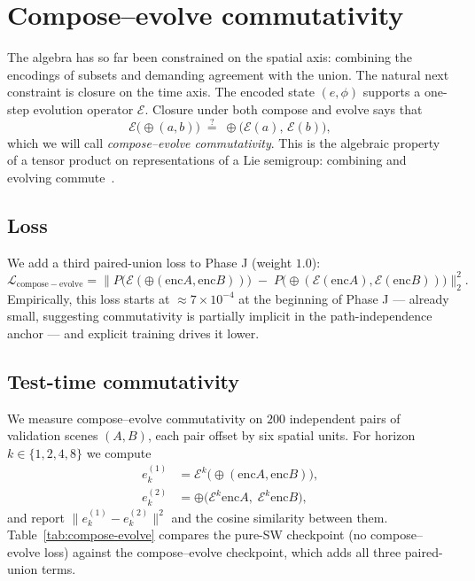 \documentclass[11pt]{article}
\newcommand{\enc}{\mathrm{enc}}
\newcommand{\combine}{\oplus}
\newcommand{\evolve}{\mathcal{E}}
\renewcommand{\frame}{\phi}
\begin{document}
\section{Compose--evolve commutativity}
\label{sec:compose-evolve}

The algebra has so far been constrained on the spatial axis: combining the encodings of subsets and demanding agreement with the union. The natural next constraint is closure on the time axis. The encoded state $(e, \frame)$ supports a one-step evolution operator $\evolve$. Closure under both compose and evolve says that
\begin{equation}
  \evolve\big(\combine(a, b)\big) \;\stackrel{?}{=}\; \combine\big(\evolve(a),\, \evolve(b)\big),
\end{equation}
which we will call \emph{compose--evolve commutativity}. This is the algebraic property of a tensor product on representations of a Lie semigroup: combining and evolving commute~\cite{villani2008optimal}.

\subsection{Loss}

We add a third paired-union loss to Phase J (weight $1.0$):
\begin{equation}
  \mathcal{L}_{\mathrm{compose-evolve}} = \big\| P\!\big(\evolve(\combine(\enc A, \enc B))\big) \;-\; P\!\big(\combine(\evolve(\enc A), \evolve(\enc B))\big) \big\|_2^2.
\end{equation}
Empirically, this loss starts at $\approx 7 \times 10^{-4}$ at the beginning of Phase J --- already small, suggesting commutativity is partially implicit in the path-independence anchor --- and explicit training drives it lower.

\subsection{Test-time commutativity}

We measure compose--evolve commutativity on $200$ independent pairs of validation scenes $(A, B)$, each pair offset by six spatial units. For horizon $k \in \{1, 2, 4, 8\}$ we compute
\begin{align}
  e^{(1)}_k &= \evolve^k\!\big(\combine(\enc A, \enc B)\big), \\
  e^{(2)}_k &= \combine\!\big(\evolve^k \enc A,\; \evolve^k \enc B\big),
\end{align}
and report $\|e^{(1)}_k - e^{(2)}_k\|^2$ and the cosine similarity between them. Table~\ref{tab:compose-evolve} compares the pure-SW checkpoint (no compose--evolve loss) against the compose--evolve checkpoint, which adds all three paired-union terms.
\end{document}
